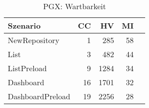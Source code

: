 \begin{table}[ht]
\centering
\caption{PGX: Wartbarkeit}
\begin{tabular}{lrrrr}
\toprule
Szenario & CC & HV & MI \\
\midrule
	NewRepository & 1 & 285 & 58 \\
	List & 3 & 482 & 44 \\
	ListPreload & 9 & 1284 & 34 \\
	Dashboard & 16 & 1701 & 32 \\
	DashboardPreload & 19 & 2256 & 28 \\
\bottomrule
\end{tabular}
\label{tab:pgx_maintainability}
\end{table}
	